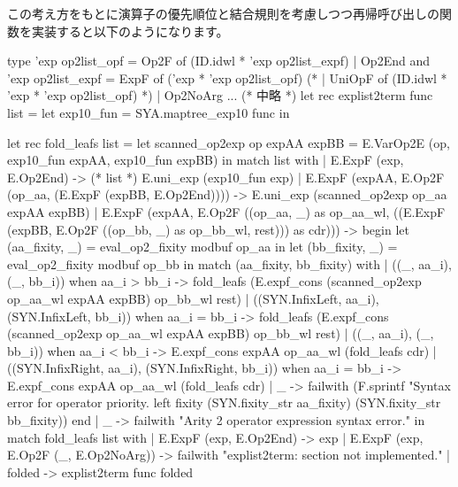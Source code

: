 \documentclass[mingoth,a4paper]{jsarticle}
\begin{document}

この考え方をもとに演算子の優先順位と結合規則を考慮しつつ再帰呼び出しの関数を実装すると以下のようになります。


\begin{commandline}
  type 'exp op2list_opf =
      Op2F of (ID.idwl * 'exp op2list_expf)
    | Op2End
  and 'exp op2list_expf =
      ExpF of ('exp * 'exp op2list_opf)
(*     | UniOpF of (ID.idwl * 'exp * 'exp op2list_opf) *)
    | Op2NoArg
  ... (* 中略 *)
  let rec explist2term func list =
    let exp10_fun = SYA.maptree_exp10 func in

    let rec fold_leafs list =
      let scanned_op2exp op expAA expBB =
        E.VarOp2E (op,
                   exp10_fun expAA,
                   exp10_fun expBB) in
        match list with
          | E.ExpF (exp, E.Op2End) -> (* list *)
              E.uni_exp (exp10_fun exp)
          | E.ExpF (expAA, E.Op2F (op_aa,
                                   (E.ExpF (expBB, E.Op2End)))) ->
              E.uni_exp (scanned_op2exp op_aa expAA expBB)
          | E.ExpF (expAA, E.Op2F ((op_aa, _) as op_aa_wl,
                                   ((E.ExpF (expBB, E.Op2F ((op_bb, _) as op_bb_wl, rest))) as cdr))) ->
              begin
                let (aa_fixity, _) = eval_op2_fixity modbuf op_aa in
                let (bb_fixity, _) = eval_op2_fixity modbuf op_bb in
                  match (aa_fixity, bb_fixity) with
                    | ((_, aa_i), (_, bb_i)) when aa_i > bb_i ->
                        fold_leafs (E.expf_cons (scanned_op2exp op_aa_wl expAA expBB) op_bb_wl rest)
                    | ((SYN.InfixLeft, aa_i), (SYN.InfixLeft, bb_i)) when aa_i = bb_i ->
                        fold_leafs (E.expf_cons (scanned_op2exp op_aa_wl expAA expBB) op_bb_wl rest)
                    | ((_, aa_i), (_, bb_i)) when aa_i < bb_i ->
                        E.expf_cons expAA op_aa_wl (fold_leafs cdr)
                    | ((SYN.InfixRight, aa_i), (SYN.InfixRight, bb_i)) when aa_i = bb_i ->
                        E.expf_cons expAA op_aa_wl (fold_leafs cdr)
                    | _ ->
                        failwith (F.sprintf "Syntax error for operator priority. left fixity %
                                    (SYN.fixity_str aa_fixity)
                                    (SYN.fixity_str bb_fixity))
              end
          | _ -> failwith "Arity 2 operator expression syntax error."
    in
      match fold_leafs list with
        | E.ExpF (exp, E.Op2End) -> exp
        | E.ExpF (exp, E.Op2F (_, E.Op2NoArg)) -> failwith "explist2term: section not implemented."
        | folded -> explist2term func folded
\end{commandline}
\end{document}
